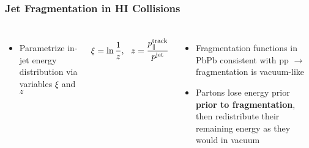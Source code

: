 \begin{frame}
  \frametitle{\textbf{Jet Fragmentation in HI Collisions}}
  \begin{columns}
    \begin{itemize}
    \item Parametrize in-jet energy distribution via variables $\xi$ and $z$
    \end{itemize}
    \begin{align*}
      \xi = \ln\frac{1}{z} ,\ \  z = \cfrac{p_\parallel^{\text{track}}}{p^{\text{jet}}}
    \end{align*}
    \begin{itemize}
    \item Fragmentation functions in PbPb consistent with pp $\to$ fragmentation is vacuum-like
    \item Partons lose energy prior \textbf{prior to fragmentation}, then redistribute their remaining energy as they would in vacuum
    \end{itemize}
  \end{columns}
\end{frame}
